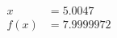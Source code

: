 \documentclass[preview]{standalone}
\begin{document}
\begin{align*}
x &= 5.0047\\f(x) &= 7.9999972
\end{align*}
\end{document}
